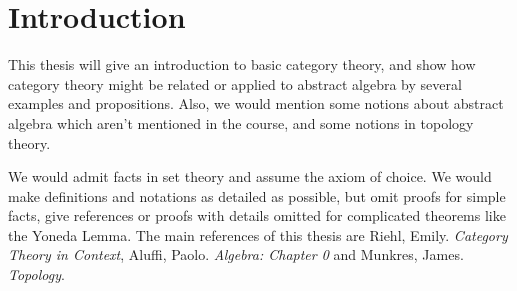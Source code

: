 \section*{Introduction}
This thesis will give an introduction to basic category theory, and show how category theory might be related or applied to abstract algebra by several examples and propositions. Also, we would mention some notions about abstract algebra which aren't mentioned in the course, and some notions in topology theory. \par
We would admit facts in set theory and assume the axiom of choice. We would make definitions and notations as detailed as possible, but omit proofs for simple facts, give references or proofs with details omitted for complicated theorems like the Yoneda Lemma. The main references of this thesis are Riehl, Emily. \textsl{Category Theory in Context}, Aluffi, Paolo. \textsl{Algebra: Chapter 0} and Munkres, James. \textsl{Topology}.